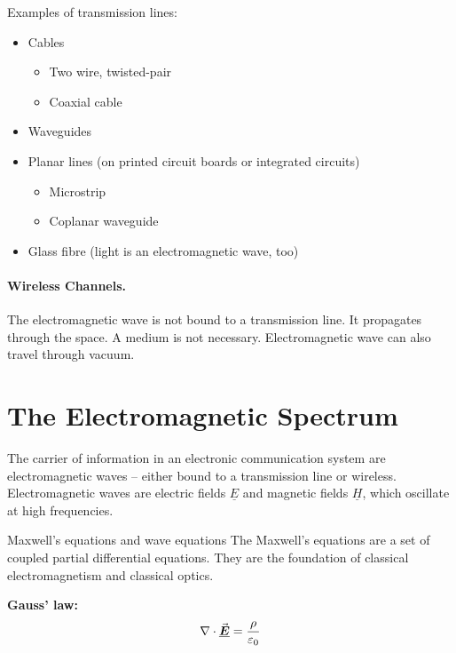 \begin{refsection}
Examples of transmission lines:
\begin{itemize}
	\item Cables
	\begin{itemize}
		\item Two wire, twisted-pair 
		\item Coaxial cable 
	\end{itemize}
	\item Waveguides 
	\item Planar lines (on printed circuit boards or integrated circuits)
	\begin{itemize}
		\item Microstrip 
		\item Coplanar waveguide 
	\end{itemize}
	\item Glass fibre (light is an electromagnetic wave, too)
\end{itemize}

\paragraph{Wireless Channels.}

The electromagnetic wave is not bound to a transmission line. It propagates through the space. A medium is not necessary. Electromagnetic wave can also travel through vacuum.

\section{The Electromagnetic Spectrum}

The carrier of information in an electronic communication system are electromagnetic waves -- either bound to a transmission line or wireless. Electromagnetic waves are electric fields $\underline{E}$ and magnetic fields $\underline{H}$, which oscillate at high frequencies.

\begin{excursus}{Maxwell's equations and wave equations}
	The Maxwell's equations are a set of coupled partial differential equations. They are the foundation of classical electromagnetism and classical optics.
	
	\textbf{Gauss' law:}
	\begin{equation}
		\nabla \cdot \vec{\bm{\underline{E}}} = \frac{\rho}{\varepsilon_0}
	\end{equation}
	

\end{excursus}
\end{refsection}
